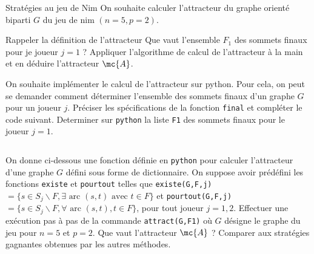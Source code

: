 \begin{exo}[PC][1][TD]{Stratégies au jeu de Nim}
 On souhaite calculer l'attracteur du graphe orienté biparti $G$ du jeu de nim $(n=5,p=2)$.
\begin{quest}
\item  Rappeler la définition de l’attracteur Que vaut l'ensemble $F_1$ des sommets finaux pour je joueur $j=1$ ? Appliquer l’algorithme de calcul de l’attracteur à la main et en déduire l’attracteur $\mc{A}$.
\item On souhaite implémenter le calcul de l’attracteur sur python. Pour cela, on peut se demander comment déterminer l’ensemble des sommets finaux d’un graphe $G$ pour un joueur $j$. Préciser les spécifications de la fonction \texttt{final} et compléter le code suivant. Determiner sur \texttt{python} la liste \texttt{F1} des sommets finaux pour le joueur $j=1$.
\inputminted[linenos=true]{python}{\pathtoexos/Info/Scripts/attract2.py}
\item  On donne ci-dessous une fonction définie en \texttt{python} pour calculer l'attracteur d'une graphe $G$ défini sous forme de dictionnaire. On suppose avoir prédéfini les fonctions \texttt{existe} et \texttt{pourtout} telles que \texttt{existe(G,F,j)}$=\{s \in S_j\backslash F, \exists \text{ arc } (s,t) \text{ avec } t \in F\}$ et \texttt{pourtout(G,F,j)}$=\{s \in S_j\backslash F, \forall \text{ arc } (s,t),  t \in F\}$, pour tout joueur $j=1,2$.
Effectuer une exécution pas à pas de la commande \texttt{attract(G,F1)} où $G$ désigne le graphe du jeu pour $n=5$ et $p=2$. Que vaut l'attracteur $\mc{A}$ ? Comparer aux stratégies gagnantes obtenues par les autres méthodes.
  \inputminted[linenos=true]{python}{\pathtoexos/Info/Scripts/attract_ds.py}


\end{quest}
\end{exo}
